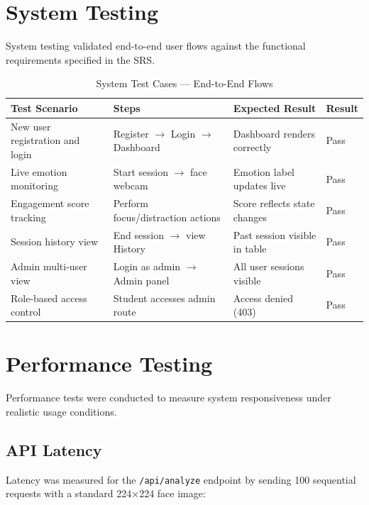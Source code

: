 \section{System Testing}

System testing validated end-to-end user flows against the functional
requirements specified in the SRS.

\begin{table}[H]
\centering
\caption{System Test Cases — End-to-End Flows}
\begin{tabular}{p{} p{} p{} l}
\toprule
\textbf{Test Scenario}          & \textbf{Steps}                      & \textbf{Expected Result}  & \textbf{Result} \\
\midrule
New user registration and login & Register $\to$ Login $\to$ Dashboard & Dashboard renders correctly & Pass \\
Live emotion monitoring         & Start session $\to$ face webcam      & Emotion label updates live  & Pass \\
Engagement score tracking       & Perform focus/distraction actions    & Score reflects state changes & Pass \\
Session history view            & End session $\to$ view History       & Past session visible in table & Pass \\
Admin multi-user view           & Login as admin $\to$ Admin panel     & All user sessions visible   & Pass \\
Role-based access control       & Student accesses admin route         & Access denied (403)         & Pass \\
\bottomrule
\end{tabular}
\end{table}

\section{Performance Testing}

Performance tests were conducted to measure system responsiveness under
realistic usage conditions.

\subsection{API Latency}

Latency was measured for the \texttt{/api/analyze} endpoint by sending
100 sequential requests with a standard 224×224 face image:


